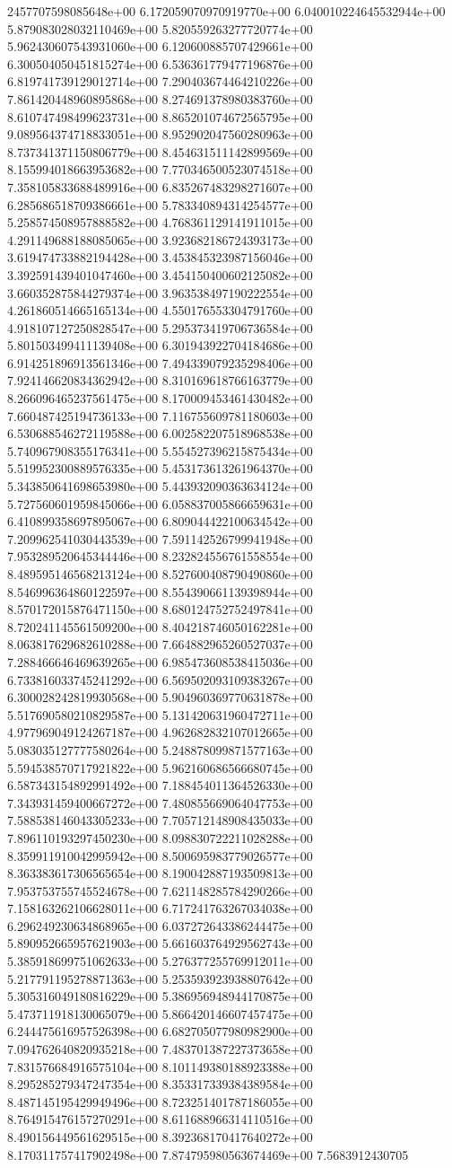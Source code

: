 2457707598085648e+00	6.172059070970919770e+00	6.040010224645532944e+00	5.879083028032110469e+00	5.820559263277720774e+00	5.962430607543931060e+00	6.120600885707429661e+00	6.300504050451815274e+00	6.536361779477196876e+00	6.819741739129012714e+00	7.290403674464210226e+00	7.861420448960895868e+00	8.274691378980383760e+00	8.610747498499623731e+00	8.865201074672565795e+00	9.089564374718833051e+00	8.952902047560280963e+00	8.737341371150806779e+00	8.454631511142899569e+00	8.155994018663953682e+00	7.770346500523074518e+00	7.358105833688489916e+00	6.835267483298271607e+00	6.285686518709386661e+00	5.783340894314254577e+00	5.258574508957888582e+00	4.768361129141911015e+00	4.291149688188085065e+00	3.923682186724393173e+00	3.619474733882194428e+00	3.453845323987156046e+00	3.392591439401047460e+00	3.454150400602125082e+00	3.660352875844279374e+00	3.963538497190222554e+00	4.261860514665165134e+00	4.550176553304791760e+00	4.918107127250828547e+00	5.295373419706736584e+00	5.801503499411139408e+00	6.301943922704184686e+00	6.914251896913561346e+00	7.494339079235298406e+00	7.924146620834362942e+00	8.310169618766163779e+00	8.266096465237561475e+00	8.170009453461430482e+00	7.660487425194736133e+00	7.116755609781180603e+00	6.530688546272119588e+00	6.002582207518968538e+00	5.740967908355176341e+00	5.554527396215875434e+00	5.519952300889576335e+00	5.453173613261964370e+00	5.343850641698653980e+00	5.443932090363634124e+00	5.727560601959845066e+00	6.058837005866659631e+00	6.410899358697895067e+00	6.809044422100634542e+00	7.209962541030443539e+00	7.591142526799941948e+00	7.953289520645344446e+00	8.232824556761558554e+00	8.489595146568213124e+00	8.527600408790490860e+00	8.546996364860122597e+00	8.554390661139398944e+00	8.570172015876471150e+00	8.680124752752497841e+00	8.720241145561509200e+00	8.404218746050162281e+00	8.063817629682610288e+00	7.664882965260527037e+00	7.288466646469639265e+00	6.985473608538415036e+00	6.733816033745241292e+00	6.569502093109383267e+00	6.300028242819930568e+00	5.904960369770631878e+00	5.517690580210829587e+00	5.131420631960472711e+00	4.977969049124267187e+00	4.962682832107012665e+00	5.083035127777580264e+00	5.248878099871577163e+00	5.594538570717921822e+00	5.962160686566680745e+00	6.587343154892991492e+00	7.188454011364526330e+00	7.343931459400667272e+00	7.480855669064047753e+00	7.588538146043305233e+00	7.705712148908435033e+00	7.896110193297450230e+00	8.098830722211028288e+00	8.359911910042995942e+00	8.500695983779026577e+00	8.363383617306565654e+00	8.190042887193509813e+00	7.953753755745524678e+00	7.621148285784290266e+00	7.158163262106628011e+00	6.717241763267034038e+00	6.296249230634868965e+00	6.037272643386244475e+00	5.890952665957621903e+00	5.661603764929562743e+00	5.385918699751062633e+00	5.276377255769912011e+00	5.217791195278871363e+00	5.253593923938807642e+00	5.305316049180816229e+00	5.386956948944170875e+00	5.473711918130065079e+00	5.866420146607457475e+00	6.244475616957526398e+00	6.682705077980982900e+00	7.094762640820935218e+00	7.483701387227373658e+00	7.831576684916575104e+00	8.101149380188923388e+00	8.295285279347247354e+00	8.353317339384389584e+00	8.487145195429949496e+00	8.723251401787186055e+00	8.764915476157270291e+00	8.611688966314110516e+00	8.490156449561629515e+00	8.392368170417640272e+00	8.170311757417902498e+00	7.874795980563674469e+00	7.5683912430705